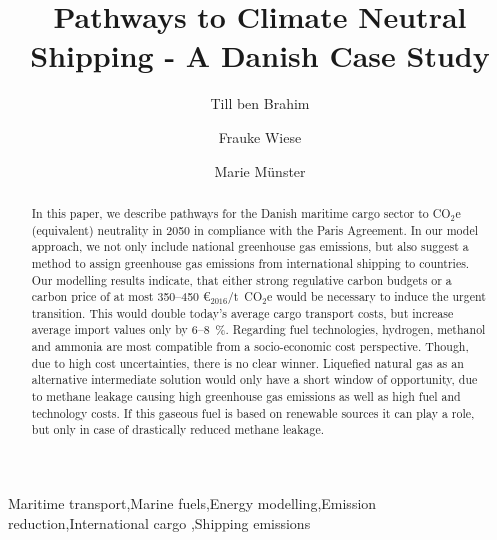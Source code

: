 \documentclass[article]{elsarticle}
\begin{document}
\begin{frontmatter}

\title{Pathways to Climate Neutral Shipping - A Danish Case Study}


\author[label1]{Till ben Brahim}
\address[label1]{Technical University of Denmark, Produktionstorvet 426, 2800 Kongens Lyngby, Denmark}


\author[label1]{Frauke Wiese}

\author[label1]{Marie M\"unster}

\begin{abstract}
In this paper, we describe pathways for the Danish maritime cargo sector to CO$_2$e (equivalent) neutrality in 2050 in compliance with the Paris Agreement. In our model approach, we not only include national greenhouse gas emissions, but also suggest a method to assign greenhouse gas emissions from international shipping to countries.
Our modelling results indicate, that either strong regulative carbon budgets or a carbon price of at most 350--450 \euro$_{2016}$/t~CO$_2$e would be necessary to induce the urgent transition. This would double today's average cargo transport costs, but increase average import values only by 6--8~\%.
Regarding fuel technologies, hydrogen, methanol and ammonia are most compatible from a socio-economic cost perspective. Though, due to high cost uncertainties, there is no clear winner.
Liquefied natural gas as an alternative intermediate solution would only have a short window of opportunity, due to methane leakage causing high greenhouse gas emissions as well as high fuel and technology costs. If this gaseous fuel is based on renewable sources it can play a role, but only in case of drastically reduced methane leakage.
\end{abstract}

\begin{keyword}
Maritime transport\sep Marine fuels\sep Energy modelling\sep Emission reduction\sep International cargo \sep Shipping emissions
\end{keyword}

\end{frontmatter}
\end{document}
